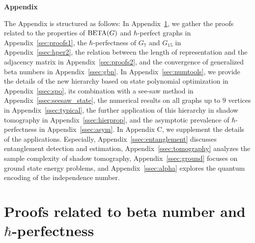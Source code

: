 \begin{center}
    {\Large \bf{Appendix}}\\ \vspace{1em}
\end{center}
The Appendix is structured as follows: In Appendix~\ref{sec:proofs}, we gather the proofs related to the properties of $\operatorname{BETA}(G)$ and $\hbar$-perfect graphs in Appendix~\ref{sec:proofs1}, the $\hbar$-perfectness of $G_7$ and $G_{15}$ in Appendix~\ref{ssec:hper2}, the relation between the length of representation and the adjacency matrix in Appendix~\ref{sec:proofs2}, and the convergence of generalized beta numbers in Appendix~\ref{ssec:gbn}. In Appendix~\ref{sec:numtools}, we provide the details of the new hierarchy based on state polynomial optimization in Appendix~\ref{ssec:spo}, its combination with a see-saw method in Appendix~\ref{ssec:seesaw_state}, the numerical results on all graphs up to $9$ vertices in Appendix~\ref{ssec:typical}, the further application of this hierarchy in shadow tomography in Appendix~\ref{ssec:hierprop}, and the asymptotic prevalence of $\hbar$-perfectness in Appendix~\ref{ssec:asym}. In Appendix C, we supplement the details of the applications. Especially, Appendix~\ref{ssec:entanglement} discusses entanglement detection and estimation, Appendix~\ref{ssec:tomography} analyzes the sample complexity of shadow tomography, Appendix~\ref{ssec:ground} focuses on ground state energy problems, and Appendix~\ref{ssec:alpha} explores the quantum encoding of the independence number.



\section{Proofs related to beta number and $\hbar$-perfectness}
\label{sec:proofs}

